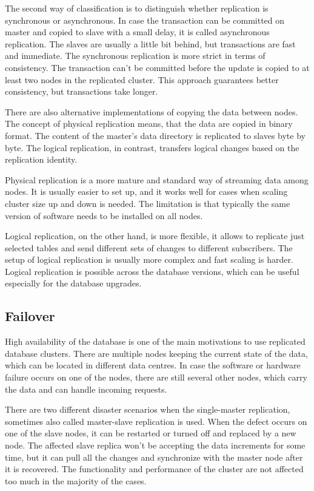 \documentclass[
  digital, %
  twoside, %
  table,   %
  lof,     %
  lot,     %
]{fithesis3}
\begin{document}
The second way of classification is to distinguish whether replication is synchronous or asynchronous. In case the transaction can be committed on master and copied to slave with a small delay, it is called asynchronous replication. The slaves are usually a little bit behind, but transactions are fast and immediate. The synchronous replication is more strict in terms of consistency. The transaction can't be committed before the update is copied to at least two nodes in the replicated cluster. This approach guarantees better consistency, but transactions take longer.

There are also alternative implementations of copying the data between nodes. The concept of physical replication means, that the data are copied in binary format. The content of the master's data directory is replicated to slaves byte by byte. The logical replication, in contrast, transfers logical changes based on the replication identity.

Physical replication is a more mature and standard way of streaming data among nodes. It is usually easier to set up, and it works well for cases when scaling cluster size up and down is needed. The limitation is that typically the same version of software needs to be installed on all nodes.

Logical replication, on the other hand, is more flexible, it allows to replicate just selected tables and send different sets of changes to different subscribers. The setup of logical replication is usually more complex and fast scaling is harder. Logical replication is possible across the database versions, which can be useful especially for the database upgrades.

\subsection{Failover} \label{sec:failover}
High availability of the database is one of the main motivations to use replicated database clusters. There are multiple nodes keeping the current state of the data, which can be located in different data centres. In case the software or hardware failure occurs on one of the nodes, there are still several other nodes, which carry the data and can handle incoming requests.

There are two different disaster scenarios when the single-master replication, sometimes also called master-slave replication is used. When the defect occurs on one of the slave nodes, it can be restarted or turned off and replaced by a new node. The affected slave replica won't be accepting the data increments for some time, but it can pull all the changes and synchronize with the master node after it is recovered. The functionality and performance of the cluster are not affected too much in the majority of the cases.
\end{document}
